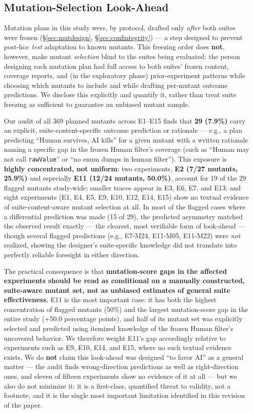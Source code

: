 \documentclass[10pt,conference]{IEEEtran}
\begin{document}
\subsection{Mutation-Selection Look-Ahead}
\label{sec:lookahead}
Mutation plans in this study were, by protocol, drafted only \emph{after} both suites were frozen (\S\ref{sec:mutdesign}, \S\ref{sec:confintegrity}) — a step designed to prevent post-hoc \emph{test} adaptation to known mutants. This freezing order does \textbf{not}, however, make mutant \emph{selection} blind to the suites being evaluated: the person designing each mutation plan had full access to both suites' frozen content, coverage reports, and (in the exploratory phase) prior-experiment patterns while choosing which mutants to include and while drafting per-mutant outcome predictions. We disclose this explicitly and quantify it, rather than treat suite freezing as sufficient to guarantee an unbiased mutant sample.

Our audit of all 369 planned mutants across E1--E15 finds that \textbf{29 (7.9\%)} carry an explicit, suite-content-specific outcome prediction or rationale — e.g., a plan predicting ``Human survives, AI kills'' for a given mutant with a written rationale naming a specific gap in the frozen Human filter's coverage (such as ``Human may not call \texttt{rawValue}'' or ``no enum dumps in human filter''). This exposure is \textbf{highly concentrated, not uniform}: two experiments, \textbf{E2 (7/27 mutants, 25.9\%)} and especially \textbf{E11 (12/24 mutants, 50.0\%)}, account for 19 of the 29 flagged mutants study-wide; smaller traces appear in E3, E6, E7, and E13; and eight experiments (E1, E4, E5, E9, E10, E12, E14, E15) show no textual evidence of suite-content-aware mutant selection at all. In most of the flagged cases where a differential prediction was made (15 of 29), the predicted asymmetry matched the observed result exactly — the clearest, most verifiable form of look-ahead — though several flagged predictions (e.g., E7-M24, E11-M05, E11-M22) were \emph{not} realized, showing the designer's suite-specific knowledge did not translate into perfectly reliable foresight in either direction.

The practical consequence is that \textbf{mutation-score gaps in the affected experiments should be read as conditional on a manually constructed, suite-aware mutant set, not as unbiased estimates of general suite effectiveness.} E11 is the most important case: it has both the highest concentration of flagged mutants (50\%) and the largest mutation-score gap in the entire study (+50.0 percentage points), and half of its mutant set was explicitly selected and predicted using itemized knowledge of the frozen Human filter's uncovered behavior. We therefore weight E11's gap accordingly relative to experiments such as E9, E10, E14, and E15, where no such textual evidence exists. We do \textbf{not} claim this look-ahead was designed ``to favor AI'' as a general matter — the audit finds wrong-direction predictions as well as right-direction ones, and eleven of fifteen experiments show no evidence of it at all — but we also do not minimize it: it is a first-class, quantified threat to validity, not a footnote, and it is the single most important limitation identified in this revision of the paper.
\end{document}
